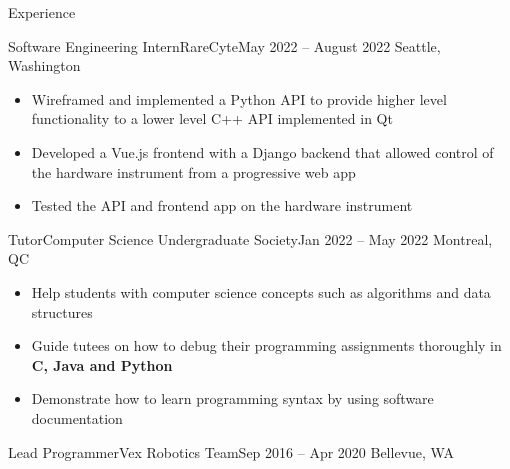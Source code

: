 \documentclass[]{mcdowellcv}
\begin{document}
\begin{cvsection}{Experience}
	\begin{cvsubsection}{Software Engineering Intern}{RareCyte}{May 2022 -- August 2022}
	\vspace{-1.5mm}
		Seattle, Washington
		\begin{itemize}%
			\item Wireframed and implemented a Python API to provide higher level functionality to a lower level C++ API implemented in Qt
			\item Developed a Vue.js frontend with a Django backend that allowed control of the hardware instrument from a progressive web app
			\item Tested the API and frontend app on the hardware instrument
		\end{itemize}
	\end{cvsubsection}
	\begin{cvsubsection}{Tutor}{Computer Science Undergraduate Society}{Jan 2022 -- May 2022}
	\vspace{-1.5mm}
		Montreal, QC
		\begin{itemize}%
			\item Help students with computer science concepts such as algorithms and data structures
			\item Guide tutees on how to debug their programming assignments thoroughly in \textbf{C, Java and Python}
			\item Demonstrate how to learn programming syntax by using software documentation
		\end{itemize}
	\end{cvsubsection}
	\begin{cvsubsection}{Lead Programmer}{Vex Robotics Team}{Sep 2016 -- Apr 2020}
	\vspace{-1.5mm}
		Bellevue, WA
		\begin{itemize}%

\end{itemize}
\end{cvsubsection}
\end{cvsection}
\end{document}

